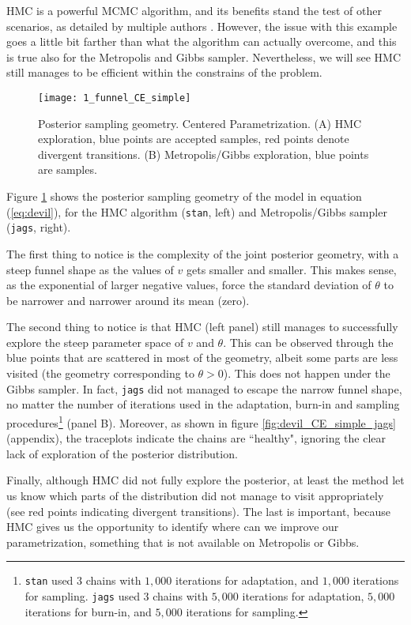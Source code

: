 HMC is a powerful MCMC algorithm, and its benefits stand the test of other scenarios, as detailed by multiple authors \cite{McElreath_2020, Gelman_et_al_2014}. However, the issue with this example goes a little bit farther than what the algorithm can actually overcome, and this is true also for the Metropolis and Gibbs sampler. Nevertheless, we will see HMC still manages to be efficient within the constrains of the problem.
%
\begin{figure}[h]
	\centering
	\texttt{[image: 1\_funnel\_CE\_simple]}
	\caption[Posterior sampling geometry. Centered Parametrization.]%
	{Posterior sampling geometry. Centered Parametrization. (A) HMC exploration, blue points are accepted samples, red points denote divergent transitions. (B) Metropolis/Gibbs exploration, blue points are samples.}
	\label{fig:devil_CE_geom}
\end{figure}

Figure \ref{fig:devil_CE_geom} shows the posterior sampling geometry of the model in equation (\ref{eq:devil}), for the HMC algorithm (\texttt{stan}, left) and Metropolis/Gibbs sampler (\texttt{jags}, right). 

The first thing to notice is the complexity of the joint posterior geometry, with a steep funnel shape as the values of $v$ gets smaller and smaller. This makes sense, as the exponential of larger negative values, force the standard deviation of $\theta$ to be narrower and narrower around its mean (zero). 

The second thing to notice is that HMC (left panel) still manages to successfully explore the steep parameter space of $v$ and $\theta$. This can be observed through the blue points that are scattered in most of the geometry, albeit some parts are less visited (the geometry corresponding to $\theta>0$). This does not happen under the Gibbs sampler. In fact, \texttt{jags} did not managed to escape the narrow funnel shape, no matter the number of iterations used in the adaptation, burn-in and sampling procedures\footnote{\texttt{stan} used $3$ chains with $1,000$ iterations for adaptation, and $1,000$ iterations for sampling. \texttt{jags} used $3$ chains with $5,000$ iterations for adaptation, $5,000$ iterations for burn-in, and $5,000$ iterations for sampling.} (panel B). Moreover, as shown in figure \ref{fig:devil_CE_simple_jags} (appendix), the traceplots indicate the chains are ``healthy", ignoring the clear lack of exploration of the posterior distribution.

Finally, although HMC did not fully explore the posterior, at least the method let us know which parts of the distribution did not manage to visit appropriately (see red points indicating divergent transitions). The last is important, because HMC gives us the opportunity to identify where can we improve our parametrization, something that is not available on Metropolis or Gibbs.


